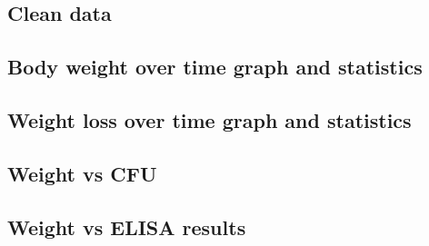 \documentclass[
]{book}
\newenvironment{Shaded}{\begin{snugshade}}{\end{snugshade}}
\newcommand{\CommentTok}[1]{\textcolor[rgb]{0.56,0.35,0.01}{\textit{#1}}}
\newcommand{\FunctionTok}[1]{\textcolor[rgb]{0.00,0.00,0.00}{#1}}
\newcommand{\NormalTok}[1]{#1}
\newcommand{\OtherTok}[1]{\textcolor[rgb]{0.56,0.35,0.01}{#1}}
\newcommand{\SpecialCharTok}[1]{\textcolor[rgb]{0.00,0.00,0.00}{#1}}
\newcommand{\StringTok}[1]{\textcolor[rgb]{0.31,0.60,0.02}{#1}}
\begin{document}
\hypertarget{clean-data}{%
\subsection{Clean data}\label{clean-data}}

\begin{Shaded}
\end{Shaded}

\begin{Shaded}
\end{Shaded}

\hypertarget{body-weight-over-time-graph-and-statistics}{%
\subsection{Body weight over time graph and statistics}\label{body-weight-over-time-graph-and-statistics}}

\hypertarget{weight-loss-over-time-graph-and-statistics}{%
\subsection{Weight loss over time graph and statistics}\label{weight-loss-over-time-graph-and-statistics}}

\hypertarget{weight-vs-cfu}{%
\subsection{Weight vs CFU}\label{weight-vs-cfu}}

\hypertarget{weight-vs-elisa-results}{%
\subsection{Weight vs ELISA results}\label{weight-vs-elisa-results}}
\end{document}
